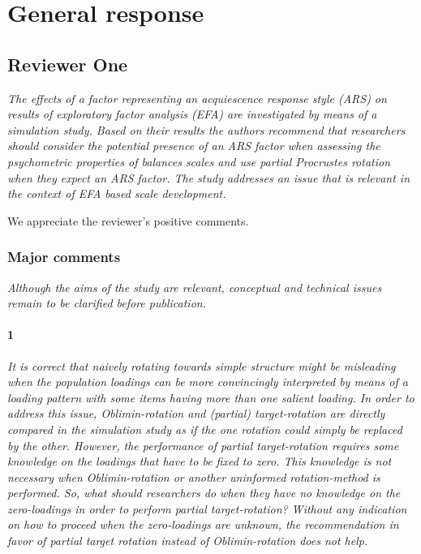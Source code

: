 \documentclass[a4paper]{article}
\begin{document}
	
		

\section*{General response}
	
\subsection*{Reviewer One}	
\textit{The effects of a factor representing an acquiescence response style (ARS) on results of exploratory factor analysis (EFA) are investigated by means of a simulation study. Based on their results the authors recommend that researchers should consider the potential presence of an ARS factor when assessing the psychometric properties of balances scales and use partial Procrustes rotation when they expect an ARS factor. The study addresses an issue that is relevant in the context of EFA based scale development.}	

We appreciate the reviewer's positive comments.
	
\subsubsection*{Major comments}
\textit{Although the aims of the study are relevant, conceptual and technical issues remain to be clarified before publication.}

\paragraph{1} \textit{It is correct that naively rotating towards simple structure might be misleading when the population loadings can be more convincingly interpreted by means of a loading pattern with some items having more than one salient loading. In order to address this issue, Oblimin-rotation and (partial) target-rotation are directly compared in the simulation study as if the one rotation could simply be replaced by the other. However, the performance of partial target-rotation requires some knowledge on the loadings that have to be fixed to zero. This knowledge is not necessary when Oblimin-rotation or another uninformed rotation-method is performed. So, what should researchers do when they have no knowledge on the zero-loadings in order to perform partial target-rotation? Without any indication on how to proceed when the zero-loadings are unknown, the recommendation in favor of partial target rotation instead of Oblimin-rotation does not help.}
\end{document}
